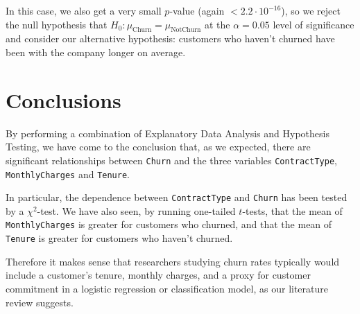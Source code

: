 \documentclass[man, floatsintext]{apa6}
\begin{document}
\hspace{0.5mm}

In this case, we also get a very small $p$-value (again $< 2.2 \cdot 10^{-16}$), so we reject the null hypothesis that $H_0: \mu_{\text{Churn}} = \mu_{\text{NotChurn}}$ at the $\alpha = 0.05$ level of significance and consider our alternative hypothesis: customers who haven't churned have been with the company longer on average.

\section{Conclusions}

By performing a combination of Explanatory Data Analysis and Hypothesis Testing, we have come to the conclusion that, as we expected, there are significant relationships between \texttt{Churn} and the three variables \texttt{ContractType}, \texttt{MonthlyCharges} and \texttt{Tenure}.

In particular, the dependence between \texttt{ContractType} and \texttt{Churn} has been tested by a $\chi^2$-test. We have also seen, by running one-tailed $t$-tests, that the mean of \texttt{MonthlyCharges} is greater for customers who churned, and that the mean of \texttt{Tenure} is greater for customers who haven't churned.

Therefore it makes sense that researchers studying churn rates typically would include a customer's tenure, monthly charges, and a proxy for customer commitment in a logistic regression or classification model, as our literature review suggests.

\newpage
\printbibliography
\end{document}
